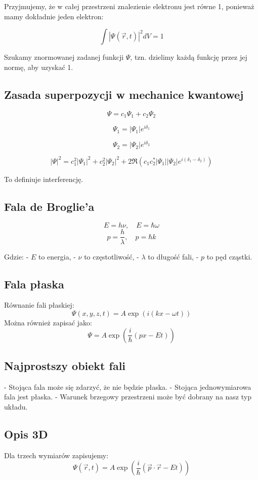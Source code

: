 Przyjmujemy, że w całej przestrzeni znalezienie elektronu jest równe 1, ponieważ mamy dokładnie jeden elektron:

\[
\int |\Psi(\vec{r}, t)|^2 dV = 1
\]

Szukamy znormowanej zadanej funkcji $\Psi$, tzn. dzielimy każdą funkcję przez jej normę, aby uzyskać 1.

\subsection{Zasada superpozycji w mechanice kwantowej}
\[
\Psi = c_1 \Psi_1 + c_2 \Psi_2
\]

\[
\Psi_1 = |\Psi_1| e^{i \delta_1}
\]

\[
\Psi_2 = |\Psi_2| e^{i \delta_2}
\]

\[
|\Psi|^2 = c_1^2 |\Psi_1|^2 + c_2^2 |\Psi_2|^2 + 2 \Re (c_1 c_2^* |\Psi_1| |\Psi_2| e^{i (\delta_1 - \delta_2)})
\]

To definiuje interferencję.

\subsection{Fala de Broglie'a}
\[
E = h\nu, \quad E = \hbar \omega
\]
\[
p = \frac{h}{\lambda}, \quad p = \hbar k
\]

Gdzie:
- $E$ to energia,
- $\nu$ to częstotliwość,
- $\lambda$ to długość fali,
- $p$ to pęd cząstki.

\subsection{Fala płaska}
Równanie fali płaskiej:
\[
\Psi(x,y,z,t) = A \exp \left( i \left( kx - \omega t \right) \right)
\]
Można również zapisać jako:
\[
\Psi = A \exp \left( \frac{i}{\hbar} (p x - E t) \right)
\]

\subsection{Najprostszy obiekt fali}
- Stojąca fala może się zdarzyć, że nie będzie płaska.
- Stojąca jednowymiarowa fala jest płaska.
- Warunek brzegowy przestrzeni może być dobrany na nasz typ układu.

\subsection{Opis 3D}
Dla trzech wymiarów zapisujemy:
\[
\Psi(\vec{r}, t) = A \exp \left( \frac{i}{\hbar} (\vec{p} \cdot \vec{r} - E t) \right)
\]

